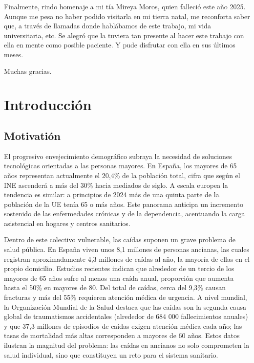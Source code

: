 \documentclass[12pt, a4paper]{article}
\begin{document}
Finalmente, rindo homenaje a mi t\'ia Mireya Moros, quien falleci\'o este a\~no 2025. Aunque me pesa no haber podido visitarla en mi tierra natal, me reconforta saber que, a trav\'es de llamadas donde hablábamos de este trabajo, mi vida universitaria, etc. Se alegró que la tuviera tan presente al hacer este trabajo con ella en mente como posible paciente. Y pude disfrutar con ella en sus últimos meses.

\vspace{1em}

Muchas gracias.

\tableofcontents

\section{Introducción}

	\subsection{Motivatión}
    
    El progresivo envejecimiento demográfico subraya la necesidad de soluciones tecnológicas orientadas a las personas mayores. En España, los mayores de 65 años representan actualmente el 20,4\% de la población total, cifra que según el INE ascenderá a más del 30\% hacia mediados de siglo\cite{INE2024}. A escala europea la tendencia es similar: a principios de 2024 más de una quinta parte de la población de la UE tenía 65 o más años\cite{Euro2025}. Este panorama anticipa un incremento sostenido de las enfermedades crónicas y de la dependencia, acentuando la carga asistencial en hogares y centros sanitarios.
    
    Dentro de este colectivo vulnerable, las caídas suponen un grave problema de salud pública. En España viven unos 8,1 millones de personas ancianas, las cuales registran aproximadamente 4,3 millones de caídas al año, la mayoría de ellas en el propio domicilio\cite{Rodriguez2015}. Estudios recientes indican que alrededor de un tercio de los mayores de 65 años sufre al menos una caída anual, proporción que aumenta hasta el 50\% en mayores de 80. Del total de caídas, cerca del 9,3\% causan fracturas y más del 55\% requieren atención médica de urgencia. A nivel mundial, la Organización Mundial de la Salud destaca que las caídas son la segunda causa global de traumatismos accidentales (alrededor de 684 000 fallecimientos anuales) y que 37,3 millones de episodios de caídas exigen atención médica cada año; las tasas de mortalidad más altas corresponden a mayores de 60 años\cite{OMS2021}. Estos datos ilustran la magnitud del problema: las caídas en ancianos no solo comprometen la salud individual, sino que constituyen un reto para el sistema sanitario.
    
\end{document}

